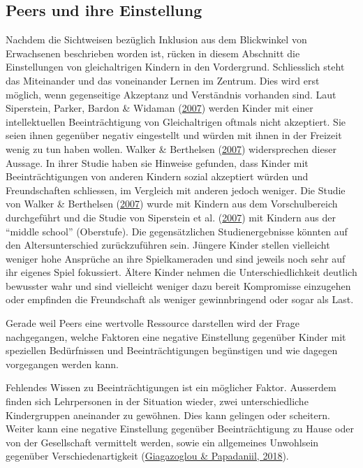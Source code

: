 \documentclass[
  ngerman,
  11pt,
  paper=a4,
  twoside,
  titlepage=true,
  openright,
  abstract=on,
  toc=listofnumbered,
  numbers=noenddot,
  chapterprefix=true,
  headings=optiontohead,
  svgnames,
  dvipsnames]{scrreprt}
\begin{document}
\hypertarget{sec:peersEinstellung}{%
\subsection{Peers und ihre Einstellung}\label{sec:peersEinstellung}}

Nachdem die Sichtweisen bezüglich Inklusion aus dem Blickwinkel von
Erwachsenen beschrieben worden ist, rücken in diesem Abschnitt die
Einstellungen von gleichaltrigen Kindern in den Vordergrund.
Schliesslich steht das Miteinander und das voneinander Lernen im
Zentrum. Dies wird erst möglich, wenn gegenseitige Akzeptanz und
Verständnis vorhanden sind. Laut Siperstein, Parker, Bardon \& Widaman
(\protect\hyperlink{ref-siperstein2007}{2007}) werden Kinder mit einer
intellektuellen Beeinträchtigung von Gleichaltrigen oftmals nicht
akzeptiert. Sie seien ihnen gegenüber negativ eingestellt und würden mit
ihnen in der Freizeit wenig zu tun haben wollen. Walker \& Berthelsen
(\protect\hyperlink{ref-walker}{2007}) widersprechen dieser Aussage. In
ihrer Studie haben sie Hinweise gefunden, dass Kinder mit
Beeinträchtigungen von anderen Kindern sozial akzeptiert würden und
Freundschaften schliessen, im Vergleich mit anderen jedoch weniger. Die
Studie von Walker \& Berthelsen (\protect\hyperlink{ref-walker}{2007})
wurde mit Kindern aus dem Vorschulbereich durchgeführt und die Studie
von Siperstein et al. (\protect\hyperlink{ref-siperstein2007}{2007}) mit
Kindern aus der “middle school” (Oberstufe). Die gegensätzlichen
Studienergebnisse könnten auf den Altersunterschied zurückzuführen sein.
Jüngere Kinder stellen vielleicht weniger hohe Ansprüche an ihre
Spielkameraden und sind jeweils noch sehr auf ihr eigenes Spiel
fokussiert. Ältere Kinder nehmen die Unterschiedlichkeit deutlich
bewusster wahr und sind vielleicht weniger dazu bereit Kompromisse
einzugehen oder empfinden die Freundschaft als weniger gewinnbringend
oder sogar als Last.

Gerade weil Peers eine wertvolle Ressource darstellen wird der Frage
nachgegangen, welche Faktoren eine negative Einstellung gegenüber Kinder
mit speziellen Bedürfnissen und Beeinträchtigungen begünstigen und wie
dagegen vorgegangen werden kann.

Fehlendes Wissen zu Beeinträchtigungen ist ein möglicher Faktor.
Ausserdem finden sich Lehrpersonen in der Situation wieder, zwei
unterschiedliche Kindergruppen aneinander zu gewöhnen. Dies kann
gelingen oder scheitern. Weiter kann eine negative Einstellung gegenüber
Beeinträchtigung zu Hause oder von der Gesellschaft vermittelt werden,
sowie ein allgemeines Unwohlsein gegenüber Verschiedenartigkeit
(\protect\hyperlink{ref-storytelllingprogram}{Giagazoglou \& Papadaniil,
2018}).
\end{document}
